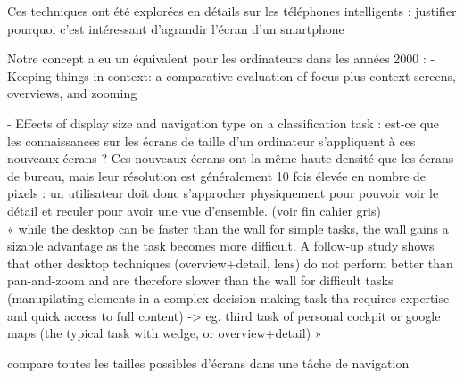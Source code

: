 Ces techniques ont été explorées en détails sur les téléphones intelligents \cite{Burigat2011} \cite{Burigat2011a} : justifier pourquoi c'est intéressant d'agrandir l'écran d'un smartphone

Notre concept a eu un équivalent pour les ordinateurs dans les années 2000 : \cite{Baudisch2002} - Keeping things in context: a comparative evaluation of focus plus context screens, overviews, and zooming


\cite{Liu2014} - Effects of display size and navigation type on a classification task : est-ce que les connaissances sur les écrans de taille d'un ordinateur s'appliquent à ces nouveaux écrans ? Ces nouveaux écrans ont la même haute densité que les écrans de bureau, mais leur résolution est généralement 10 fois élevée en nombre de pixels : un utilisateur doit donc s'approcher physiquement pour pouvoir voir le détail et reculer pour avoir une vue d'ensemble. (voir fin cahier gris)\\
« while the desktop can be faster than the wall for simple tasks, the wall gains a sizable advantage as the task becomes more difficult. A follow-up study shows that other desktop techniques (overview+detail, lens) do not perform better than pan-and-zoom and are therefore slower than the wall for difficult tasks (manupilating elements in a complex decision making task tha requires expertise and quick access to full content) -> eg. third task of personal cockpit or google maps (the typical task with wedge, or overview+detail) »


\cite{Raedle2014} compare toutes les tailles possibles d'écrans dans une tâche de navigation

